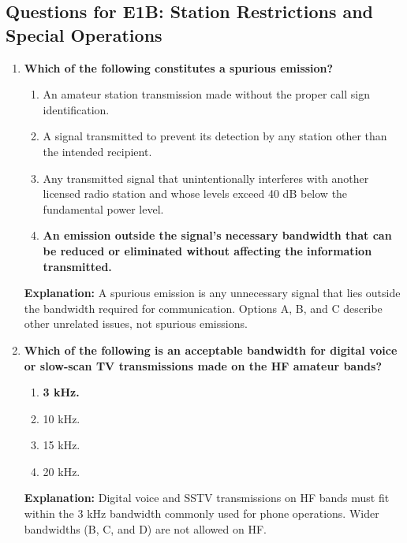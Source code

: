 \subsection*{Questions for E1B: Station Restrictions and Special Operations}
\begin{enumerate}
    \item \textbf{Which of the following constitutes a spurious emission?}
    \begin{enumerate}
        \item An amateur station transmission made without the proper call sign identification.\\
        \item A signal transmitted to prevent its detection by any station other than the intended recipient.\\
        \item Any transmitted signal that unintentionally interferes with another licensed radio station and whose levels exceed 40 dB below the fundamental power level.\\
        \item \textbf{An emission outside the signal’s necessary bandwidth that can be reduced or eliminated without affecting the information transmitted.}
    \end{enumerate}
    \textbf{Explanation:} A spurious emission is any unnecessary signal that lies outside the bandwidth required for communication. Options A, B, and C describe other unrelated issues, not spurious emissions.

    \item \textbf{Which of the following is an acceptable bandwidth for digital voice or slow-scan TV transmissions made on the HF amateur bands?}
    \begin{enumerate}
        \item \textbf{3 kHz.}\\
        \item 10 kHz.\\
        \item 15 kHz.\\
        \item 20 kHz.
    \end{enumerate}
    \textbf{Explanation:} Digital voice and SSTV transmissions on HF bands must fit within the 3 kHz bandwidth commonly used for phone operations. Wider bandwidths (B, C, and D) are not allowed on HF.


\end{enumerate}
